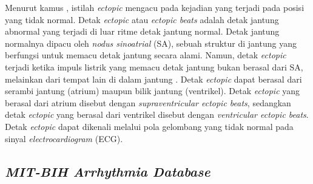 

Menurut kamus \textcite{merriam-websterDefinitionECTOPIC2024}, istilah \textit{ectopic} mengacu pada kejadian yang terjadi pada posisi yang tidak normal.
Detak \textit{ectopic} atau \textit{ectopic beats} adalah detak jantung abnormal yang terjadi di luar ritme detak jantung normal.
Detak jantung normalnya dipacu oleh \textit{nodus sinoatrial} (SA), sebuah struktur di jantung yang berfungsi untuk memacu detak jantung secara alami.
Namun, detak \textit{ectopic} terjadi ketika impuls listrik yang memacu detak jantung bukan berasal dari SA, melainkan dari tempat lain di dalam jantung \parencite{mahidasaagarEctopicBeats}.
Detak \textit{ectopic} dapat berasal dari serambi jantung (atrium) maupun bilik jantung (ventrikel).
Detak \textit{ectopic} yang berasal dari atrium disebut dengan \textit{supraventricular ectopic beats}, sedangkan detak \textit{ectopic} yang berasal dari ventrikel disebut dengan \textit{ventricular ectopic beats}.
Detak \textit{ectopic} dapat dikenali melalui pola gelombang yang tidak normal pada sinyal \textit{electrocardiogram} (ECG).
%

\subsection{\textit{MIT-BIH Arrhythmia Database}}
\label{subsec: landasan-mitbih}

